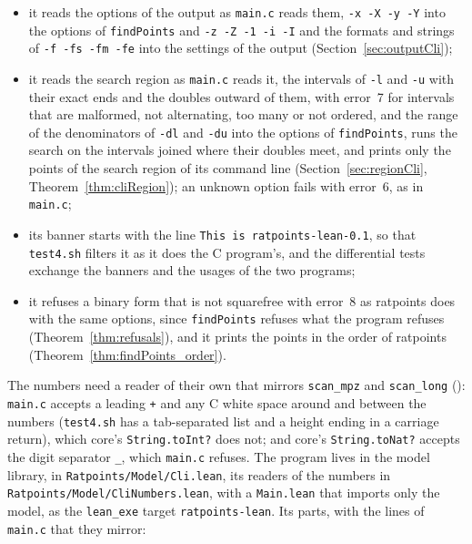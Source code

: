 \begin{itemize}
    , ), with error~6 for a malformed depth;
  \item it reads the options of the output as \verb|main.c| reads them, \verb|-x -X -y -Y| into
    the options of \verb|findPoints| and \verb|-z -Z -1 -i -I| and the formats and strings of
    \verb|-f -fs -fm -fe| into the settings of the output (Section~\ref{sec:outputCli});
  \item it reads the search region as \verb|main.c| reads it, the intervals of \verb|-l| and
    \verb|-u| with their exact ends and the doubles outward of them, with error~7 for intervals that
    are malformed, not alternating, too many or not ordered, and the range of the denominators of
    \verb|-dl| and \verb|-du| into the options of \verb|findPoints|, runs the search on the
    intervals joined where their doubles meet, and prints only the points of the search region of
    its command line (Section~\ref{sec:regionCli}, Theorem~\ref{thm:cliRegion}); an unknown option
    fails with error~6, as in \verb|main.c|;
  \item its banner starts with the line \verb|This is ratpoints-lean-0.1|, so that
    \verb|test4.sh| filters it as it does the C program's, and the differential tests exchange
    the banners and the usages of the two programs;
  \item it refuses a binary form that is not squarefree with error~8 as ratpoints does with the
    same options, since \verb|findPoints| refuses what the program refuses
    (Theorem~\ref{thm:refusals}), and it prints the points in the order of ratpoints
    (Theorem~\ref{thm:findPoints_order}).
\end{itemize}
The numbers need a reader of their own that mirrors \verb|scan_mpz| and \verb|scan_long|
(): \verb|main.c| accepts a leading \verb|+| and any C white space
around and between the numbers (\verb|test4.sh| has a tab-separated list and a height ending in
a carriage return), which core's \verb|String.toInt?| does not; and core's \verb|String.toNat?|
accepts the digit separator \verb|_|, which \verb|main.c| refuses. The program lives in the model
library, in \verb|Ratpoints/Model/Cli.lean|, its readers of the numbers in
\verb|Ratpoints/Model/CliNumbers.lean|, with a \verb|Main.lean| that imports only the model, as the
\verb|lean_exe| target \verb|ratpoints-lean|. Its parts, with the lines of \verb|main.c| that they
mirror:

